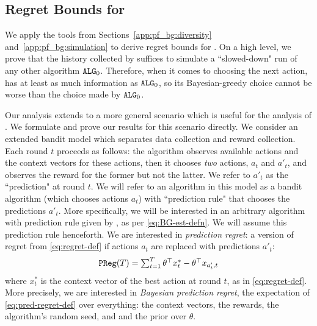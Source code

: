 \subsection{Regret Bounds for \BayesGreedy}
\label{sec:bg-proofs-bg}

We apply the tools from Sections~\ref{app:pf_bg:diversity} and~\ref{app:pf_bg:simulation} to derive regret bounds for \bg. On a high level, we prove that the history collected by \bg suffices to simulate a ``slowed-down" run of any other algorithm $\mathtt{ALG}_0$. Therefore, when it comes to choosing the next action, \bg has at least as much information as $\mathtt{ALG}_0$, so its Bayesian-greedy choice cannot be worse than the choice made by $\mathtt{ALG}_0$.


Our analysis extends to a more general scenario which is useful for the analysis of \fg. We formulate and prove our results for this scenario directly. We consider an extended bandit model which separates data collection and reward collection. Each round $t$ proceeds as follows: the algorithm observes available actions and the context vectors for these actions, then it chooses \emph{two} actions, $a_t$ and $a'_t$, and observes the reward for the former but not the latter. We refer to $a'_t$ as the ``prediction" at round $t$. We will refer to an algorithm in this model as a bandit algorithm (which chooses actions $a_t$) with ``prediction rule" that chooses the predictions $a'_t$. More specifically, we will be interested in an arbitrary \GreedyStyle algorithm with prediction rule given by \bg, as per
\eqref{eq:BG-est-defn}. We will assume this prediction rule henceforth. We are interested in \emph{prediction regret}: a version of regret from \eqref{eq:regret-def} if actions $a_t$ are replaced with predictions $a'_t$:
\begin{align}\label{eq:pred-regret-def}
\mathtt{PReg}(T) = \textstyle
    \sum_{t=1}^T \theta^{\top} x_t^* -
\theta^{\top} x_{a'_t, t}
\end{align}
 where $x^*_{t}$ is the context vector of the best action at round $t$, as in \eqref{eq:regret-def}.
More precisely, we are interested in \emph{Bayesian prediction regret}, the expectation of \eqref{eq:pred-regret-def} over everything: the context vectors, the rewards, the algorithm's random seed, and and the prior over $\theta$.

